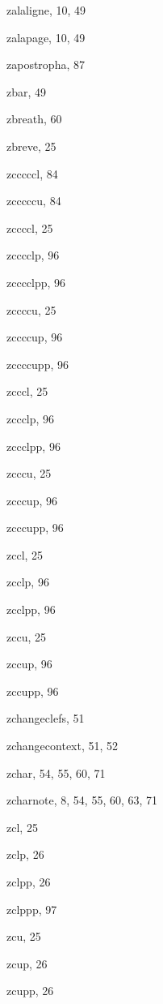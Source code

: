 \begin{theindex}
  \item {\Bslash zalaligne}, 10, 49
  \item {\Bslash zalapage}, 10, 49
  \item {\Bslash zapostropha}, 87
  \item {\Bslash zbar}, 49
  \item {\Bslash zbreath}, 60
  \item {\Bslash zbreve}, 25
  \item {\Bslash zcccccl}, 84
  \item {\Bslash zcccccu}, 84
  \item {\Bslash zccccl}, 25
  \item {\Bslash zcccclp}, 96
  \item {\Bslash zcccclpp}, 96
  \item {\Bslash zccccu}, 25
  \item {\Bslash zccccup}, 96
  \item {\Bslash zccccupp}, 96
  \item {\Bslash zcccl}, 25
  \item {\Bslash zccclp}, 96
  \item {\Bslash zccclpp}, 96
  \item {\Bslash zcccu}, 25
  \item {\Bslash zcccup}, 96
  \item {\Bslash zcccupp}, 96
  \item {\Bslash zccl}, 25
  \item {\Bslash zcclp}, 96
  \item {\Bslash zcclpp}, 96
  \item {\Bslash zccu}, 25
  \item {\Bslash zccup}, 96
  \item {\Bslash zccupp}, 96
  \item {\Bslash zchangeclefs}, 51
  \item {\Bslash zchangecontext}, 51, 52
  \item {\Bslash zchar}, 54, 55, 60, 71
  \item {\Bslash zcharnote}, 8, 54, 55, 60, 63, 71
  \item {\Bslash zcl}, 25
  \item {\Bslash zclp}, 26
  \item {\Bslash zclpp}, 26
  \item {\Bslash zclppp}, 97
  \item {\Bslash zcu}, 25
  \item {\Bslash zcup}, 26
  \item {\Bslash zcupp}, 26

\end{theindex}
